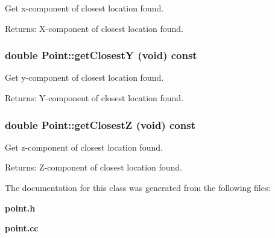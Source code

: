 Get x-component of closest location found. \begin{Desc}
\item[Returns:]X-component of closest location found. \end{Desc}
\subsubsection{\setlength{\rightskip}{0pt plus 5cm}double Point::get\-Closest\-Y (void) const}\label{classPoint_d2263a9c0fd712341f7ea6f64f20e708}


Get y-component of closest location found. \begin{Desc}
\item[Returns:]Y-component of closest location found. \end{Desc}
\subsubsection{\setlength{\rightskip}{0pt plus 5cm}double Point::get\-Closest\-Z (void) const}\label{classPoint_456c02ba981b5ed95cc154acfbb1edb6}


Get z-component of closest location found. \begin{Desc}
\item[Returns:]Z-component of closest location found. \end{Desc}


The documentation for this class was generated from the following files:\begin{CompactItemize}
\item 
{\bf point.h}\item 
{\bf point.cc}\end{CompactItemize}
